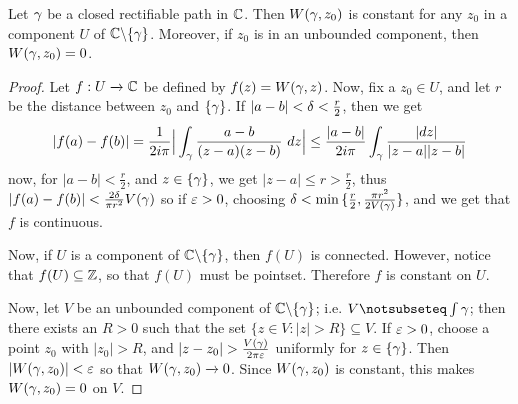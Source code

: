 \begin{theorem}\label{4.5.3}
    Let $\gamma$ be a closed rectifiable path in  $\mathbb{C}$. Then  $W(\gamma,z_0)$ is
    constant for any $z_0$ in a component $U$ of  $\mathbb{C} \backslash \{\gamma\}$. Moreover,
    if $z_0$ is in an unbounded component, then  $W(\gamma,z_0)=0$.
\end{theorem}
\begin{proof}
    Let $f:U \xrightarrow{} \mathbb{C}$ be defined by $f(z)=W(\gamma,z)$. Now, fix a $z_0
    \in U$, and let $r$ be the distance between  $z_0$ and $\{\gamma\}$. If
    $|a-b|<\delta<\frac{r}{2}$, then we  get
    \begin{equation*}
        |f(a)-f(b)|=
        \frac{1}{2i\pi}\Big{|} \int_\gamma{\frac{a-b}{(z-a)(z-b)} \ dz} \Big{|} \leq
        \frac{|a-b|}{2i\pi}\int_\gamma{\frac{|dz|}{|z-a||z-b|}}
    \end{equation*}
    now, for $|a-b|<\frac{r}{2}$, and $z \in \{\gamma\}$, we get $|z-a| \leq
    r>\frac{r}{2}$, thus $|f(a)-f(b)|<\frac{2\delta}{\pi{r^2}}V(\gamma)$ so if $\varepsilon>0$,
    choosing  $\delta<\min{\{\frac{r}{2}, \frac{\pi{r^2}}{2V(\gamma)}\}}$, and we get
    that $f$ is continuous.

    Now, if $U$ is a component of $\mathbb{C} \backslash \{\gamma\}$, then $f(U)$ is connected.
    However, notice that $f(U) \subseteq \mathbb{Z}$, so that $f(U)$ must be pointset.
    Therefore $f$ is constant on $U$.

    Now, let $V$ be an unbounded component of $\mathbb{C} \backslash \{\gamma\}$; i.e. $V
    \notsubseteq \int{\y}$; then there exists an $R>0$ such that the set  $\{z
    \in V : |z|>R\} \subseteq V$. If $\varepsilon>0$, choose a point  $z_0$ with
    $|z_0|>R$, and $|z-z_0|>\frac{V(\y)}{2\pi\e}$ uniformly for $z \in
    \{\gamma\}$. Then $|W(\gamma,z_0)|<\varepsilon$ so that $W(\gamma,z_0) \xrightarrow{} 0$. Since
    $W(\gamma,z_0)$ is constant, this makes $W(\gamma,z_0)=0$ on $V$.
\end{proof}
